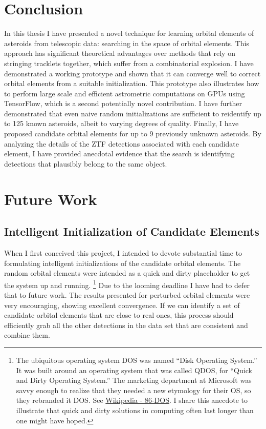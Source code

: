 \section{Conclusion}
\label{search_conclusion}
In this thesis I have presented a novel technique for learning orbital elements of asteroids from telescopic data: searching in the space of orbital elements.
This approach has significant theoretical advantages over methods that rely on stringing tracklets together, which suffer from a combinatorial explosion.
I have demonstrated a working prototype and shown that it can converge well to correct orbital elements from a suitable initialization.
This prototype also illustrates how to perform large scale and efficient astrometric computations on GPUs using TensorFlow,
which is a second potentially novel contribution.
I have further demonstrated that even naive random initializations are sufficient to reidentify up to 125 known asteroids, albeit to varying degrees of quality.
Finally, I have proposed candidate orbital elements for up to 9 previously unknown asteroids.
By analyzing the details of the ZTF detections associated with each candidate element,
I have provided anecdotal evidence that the search is identifying detections that plausibly belong to the same object.

\section{Future Work}
\label{section_future_work}

\subsection{Intelligent Initialization of Candidate Elements}
\label{subsection_intelligent_initialization}
When I first conceived this project, I intended to devote substantial time to formulating intelligent initializations of the candidate orbital elements.
The random orbital elements were intended as a quick and dirty placeholder to get the system up and running.
\footnote{The ubiquitous operating system DOS was named ``Disk Operating System.''
It was built around an operating system that was called QDOS, for ``Quick and Dirty Operating System.''
The marketing department at Microsoft was savvy enough to realize that they needed a new etymology 
for their OS, so they rebranded it DOS.
See \href{https://en.wikipedia.org/wiki/86-DOS}{Wikipedia - 86-DOS}.
I share this anecdote to illustrate that quick and dirty solutions in computing often last longer than one might have hoped.}
Due to the looming deadline I have had to defer that to future work.
The results presented for perturbed orbital elements were very encouraging, showing excellent convergence.
If we can identify a set of candidate orbital elements that are close to real ones, this process should efficiently grab
all the other detections in the data set that are consistent and combine them.


